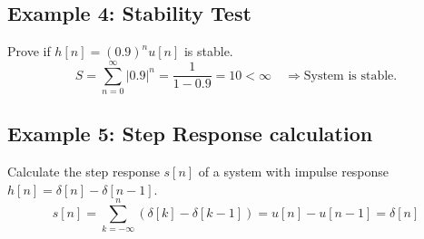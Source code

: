 \documentclass[11pt,a4paper]{article}
\begin{document}
\subsection{Example 4: Stability Test}
Prove if $h[n] = (0.9)^n u[n]$ is stable.
\begin{equation*}
S = \sum_{n=0}^{\infty} |0.9|^n = \frac{1}{1 - 0.9} = 10 < \infty \quad \Longrightarrow \text{System is stable.}
\end{equation*}

\subsection{Example 5: Step Response calculation}
Calculate the step response $s[n]$ of a system with impulse response $h[n] = \delta[n] - \delta[n-1]$.
\begin{equation*}
s[n] = \sum_{k=-\infty}^{n} (\delta[k] - \delta[k-1]) = u[n] - u[n-1] = \delta[n]
\end{equation*}
\end{document}
